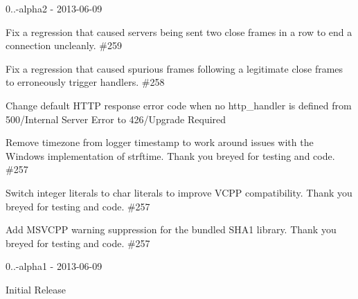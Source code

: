 0..-\/alpha2 -\/ 2013-\/06-\/09
\begin{DoxyItemize}
\item Fix a regression that caused servers being sent two close frames in a row to end a connection uncleanly. \#259
\item Fix a regression that caused spurious frames following a legitimate close frames to erroneously trigger handlers. \#258
\item Change default H\+T\+TP response error code when no http\+\_\+handler is defined from 500/\+Internal Server Error to 426/\+Upgrade Required
\item Remove timezone from logger timestamp to work around issues with the Windows implementation of strftime. Thank you breyed for testing and code. \#257
\item Switch integer literals to char literals to improve V\+C\+PP compatibility. Thank you breyed for testing and code. \#257
\item Add M\+S\+V\+C\+PP warning suppression for the bundled S\+H\+A1 library. Thank you breyed for testing and code. \#257
\end{DoxyItemize}

0..-\/alpha1 -\/ 2013-\/06-\/09
\begin{DoxyItemize}
\item Initial Release 
\end{DoxyItemize}